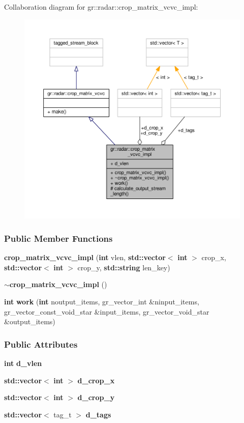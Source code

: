 Collaboration diagram for gr\+:\+:radar\+:\+:crop\+\_\+matrix\+\_\+vcvc\+\_\+impl\+:
\nopagebreak
\begin{figure}[H]
\begin{center}
\leavevmode
\includegraphics[width=350pt]{dc/dc0/classgr_1_1radar_1_1crop__matrix__vcvc__impl__coll__graph}
\end{center}
\end{figure}
\subsubsection*{Public Member Functions}
\begin{DoxyCompactItemize}
\item 
{\bf crop\+\_\+matrix\+\_\+vcvc\+\_\+impl} ({\bf int} vlen, {\bf std\+::vector}$<$ {\bf int} $>$ crop\+\_\+x, {\bf std\+::vector}$<$ {\bf int} $>$ crop\+\_\+y, {\bf std\+::string} len\+\_\+key)
\item 
{\bf $\sim$crop\+\_\+matrix\+\_\+vcvc\+\_\+impl} ()
\item 
{\bf int} {\bf work} ({\bf int} noutput\+\_\+items, gr\+\_\+vector\+\_\+int \&ninput\+\_\+items, gr\+\_\+vector\+\_\+const\+\_\+void\+\_\+star \&input\+\_\+items, gr\+\_\+vector\+\_\+void\+\_\+star \&output\+\_\+items)
\end{DoxyCompactItemize}
\subsubsection*{Public Attributes}
\begin{DoxyCompactItemize}
\item 
{\bf int} {\bf d\+\_\+vlen}
\item 
{\bf std\+::vector}$<$ {\bf int} $>$ {\bf d\+\_\+crop\+\_\+x}
\item 
{\bf std\+::vector}$<$ {\bf int} $>$ {\bf d\+\_\+crop\+\_\+y}
\item 
{\bf std\+::vector}$<$ tag\+\_\+t $>$ {\bf d\+\_\+tags}
\end{DoxyCompactItemize}
